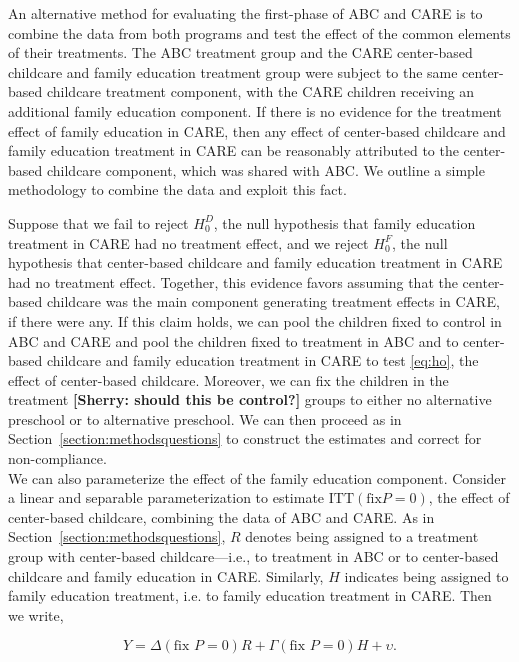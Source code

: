 \noindent An alternative method for evaluating the first-phase of ABC and CARE is to combine the data from both programs and test the effect of the common elements of their treatments. The ABC treatment group and the CARE center-based childcare and family education treatment group were subject to the same center-based childcare treatment component, with the CARE children receiving an additional family education component. If there is no evidence for the treatment effect of family education in CARE, then any effect of center-based childcare and family education treatment in CARE can be reasonably attributed to the center-based childcare component, which was shared with ABC. We outline a simple methodology to combine the data and exploit this fact.\\

\noindent 

Suppose that we fail to reject $H_{0}^D$, the null hypothesis that family education treatment in CARE had no treatment effect, and we reject $H_{0}^F$, the null hypothesis that center-based childcare and family education treatment in CARE had no treatment effect. Together, this evidence favors assuming that the center-based childcare was the main component generating treatment effects in CARE, if there were any. If this claim holds, we can pool the children fixed to control in ABC and CARE and pool the children fixed to treatment in ABC and to center-based childcare and family education treatment in CARE to test \eqref{eq:ho}, the effect of center-based childcare. Moreover, we can fix the children in the treatment \textbf{[Sherry: should this be control?]} groups to either no alternative preschool or to alternative preschool. We can then proceed as in Section~\ref{section:methodsquestions} to construct the estimates and correct for non-compliance.\\

\noindent We can also parameterize the effect of the family education component. Consider a linear and separable parameterization to estimate $\text{ITT} \left( \text{fix} P = 0\right)$, the effect of center-based childcare, combining the data of ABC and CARE. As in Section~\ref{section:methodsquestions}, $R$ denotes being assigned to a treatment group with center-based childcare---i.e., to treatment in ABC or to center-based childcare and family education in CARE. Similarly, $H$ indicates being assigned to family education treatment, i.e. to family education treatment in CARE. Then we write, 

\begin{equation}
Y = \Delta \left( \text{fix } P = 0\right) R +  \Gamma \left( \text{fix } P = 0\right) H + \upsilon. \label{eq:fixfam}
\end{equation}


